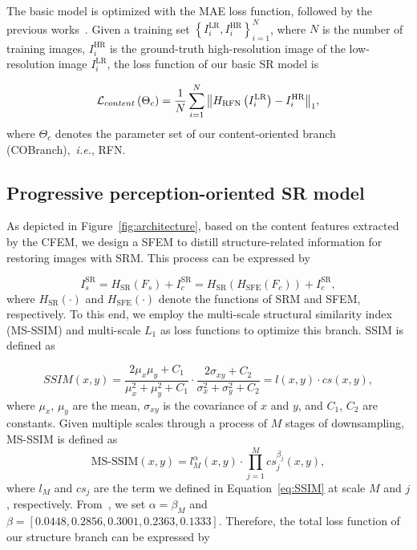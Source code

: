 \documentclass[preprint]{elsarticle}
\newcommand{\ie}{\textit{i.e.}}
\begin{document}
The basic model is optimized with the MAE loss function, followed by the previous works~\cite{EDSR,RDN,RCAN}. Given a training set $\left\{ {I_i^\text{LR},I_i^\text{HR}} \right\}_{i = 1}^N$, where $N$ is the number of training images, ${I_i^\text{HR}}$ is the ground-truth high-resolution image of the low-resolution image ${I_i^\text{LR}}$, the loss function of our basic SR model is

\begin{equation}\label{eq:l1-loss}
{{\cal L}_{content}}\left( \Theta_c  \right) = \frac{1}{N}\sum\limits_{i = 1}^N {{{\left\| {{H_\text{RFN}}\left( {I_i^\text{LR}} \right) - I_i^\text{HR}} \right\|}_1}} ,
\end{equation}
where $\Theta_c$ denotes the parameter set of our content-oriented branch (COBranch),~\ie, RFN.
\subsection{Progressive perception-oriented SR model}\label{branch}
As depicted in Figure~\ref{fig:architecture}, based on the content features extracted by the CFEM, we design a SFEM to distill structure-related information for restoring images with SRM. This process can be expressed by

\begin{equation}\label{eq:bo-branch}
I_s^\text{SR} = {H_\text{SR}}\left( {{F_s}} \right) + I_c^\text{SR} = {H_\text{SR}}\left( {{H_\text{SFE}}\left( {{F_c}} \right)} \right) + I_c^\text{SR} ,
\end{equation}
where ${H_\text{SR}}\left(  \cdot  \right)$ and ${{H_\text{SFE}}\left( \cdot \right)}$ denote the functions of SRM and SFEM, respectively. To this end, we employ the multi-scale structural similarity index (MS-SSIM) and multi-scale ${L_1}$ as loss functions to optimize this branch. SSIM is defined as

\begin{equation}\label{eq:SSIM}
SSIM\left( {x,y} \right) = \frac{{2{\mu _x}{\mu _y} + {C_1}}}{{\mu _x^2 + \mu _y^2 + {C_1}}} \cdot \frac{{2{\sigma _{xy}} + {C_2}}}{{\sigma _x^2 + \sigma _y^2 + {C_2}}} = l\left( {x,y} \right) \cdot cs\left( {x,y} \right),
\end{equation}
where ${\mu _x}$, ${\mu _y}$ are the mean, ${{\sigma _{xy}}}$ is the covariance of $x$ and $y$, and ${C_1}$, ${C_2}$ are constants. Given multiple scales through a process of $M$ stages of downsampling, MS-SSIM is defined as
\begin{equation}\label{eq:MS-SSIM}
\text{MS-SSIM}(x,y) = l_M^\alpha \left( {x,y} \right) \cdot \prod\limits_{j = 1}^M {cs_j^{{\beta _j}}\left( {x,y} \right)} ,
\end{equation}
where ${l_M}$ and ${cs}_j$ are the term we defined in Equation~\ref{eq:SSIM} at scale $M$ and $j$, respectively. From~\cite{MS-SSIM}, we set $\alpha  = {\beta _M}$ and $\beta  = \left[ {0.0448,0.2856,0.3001,0.2363,0.1333} \right]$. Therefore, the total loss function of our structure branch can be expressed by
\end{document}
